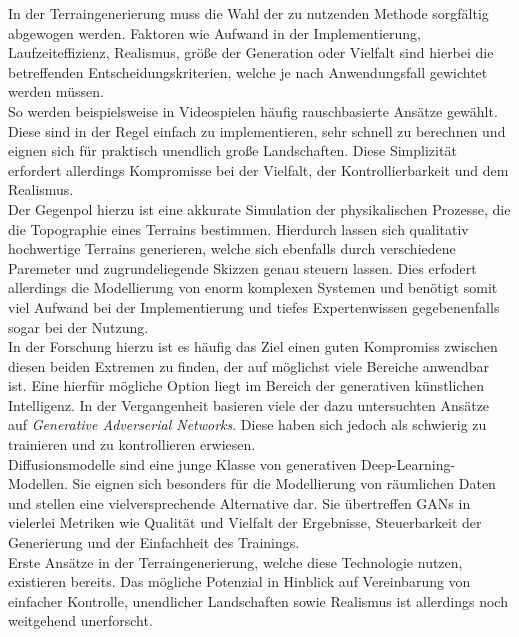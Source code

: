 In der Terraingenerierung muss die Wahl der zu nutzenden Methode sorgfältig abgewogen werden. Faktoren wie Aufwand in der Implementierung, Laufzeiteffizienz, Realismus, größe der Generation oder Vielfalt sind hierbei die betreffenden Entscheidungskriterien, welche je nach Anwendungsfall gewichtet werden müssen. \\
So werden beispielsweise in Videospielen häufig rauschbasierte Ansätze gewählt. Diese sind in der Regel einfach zu implementieren, sehr schnell zu berechnen und eignen sich für praktisch unendlich große Landschaften. Diese Simplizität erfordert allerdings Kompromisse bei der Vielfalt, der Kontrollierbarkeit und dem Realismus. \\
Der Gegenpol hierzu ist eine akkurate Simulation der physikalischen Prozesse, die die Topographie eines Terrains bestimmen. Hierdurch lassen sich qualitativ hochwertige Terrains generieren, welche sich ebenfalls durch verschiedene Paremeter und zugrundeliegende Skizzen genau steuern lassen. Dies erfodert allerdings die Modellierung von enorm komplexen Systemen und benötigt somit viel Aufwand bei der Implementierung und tiefes Expertenwissen gegebenenfalls sogar bei der Nutzung. \\
In der Forschung hierzu ist es häufig das Ziel einen guten Kompromiss zwischen diesen beiden Extremen zu finden, der auf möglichst viele Bereiche anwendbar ist. Eine hierfür mögliche Option liegt im Bereich der generativen künstlichen Intelligenz. In der Vergangenheit basieren viele der dazu untersuchten Ansätze auf \textit{Generative Adverserial Networks}. Diese haben sich jedoch als schwierig zu trainieren und zu kontrollieren erwiesen. \\
Diffusionsmodelle sind eine junge Klasse von generativen Deep-Learning-Modellen. Sie eignen sich besonders für die Modellierung von räumlichen Daten und stellen eine vielversprechende Alternative dar. Sie übertreffen GANs in vielerlei Metriken wie Qualität und Vielfalt der Ergebnisse, Steuerbarkeit der Generierung und der Einfachheit des Trainings. \\
Erste Ansätze in der Terraingenerierung, welche diese Technologie nutzen, existieren bereits. Das mögliche Potenzial in Hinblick auf Vereinbarung von einfacher Kontrolle, unendlicher Landschaften sowie Realismus ist allerdings noch weitgehend unerforscht.

